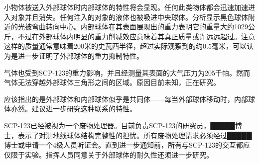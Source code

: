 小物体被送入外部球体时内部球体的特性将会显现。任何此类物体都会迅速加速进入对象并且消失。任何注入的对象的液体也被吸进中央球体。分析显示黑色球体附近的光被弯曲转向中心。内部球体在其表面展现出的重力表明它的重量大约1029公斤，不过在外部球体内明显的重力削减效应意味着其真正质量或许远远超过。注意这样的质量通常意味着200米的史瓦西半径，超过实际观察到的约0.5毫米，可以认为是进一步证明了外部球体的重力抑制特性。

气体也受到SCP-123的重力影响，并且经测量其表面的大气压力为205千帕。然而气体无法穿越外部球体三角形之间的区域。原因目前未知，正在研究。

应该指出的是外部球体和内部球体似乎是共同体——每当外部球体移动时，内部球体亦然。建议进一步研究这种联系的特性。

SCP-123已经被视为一个废物处理器。目前负责SCP-123的研究员，█████博士，表示了对测地线球体结构完整性的担忧。所有废物处理请求必须经过█████博士或申请一个4级人员听证会。直到进一步通知前，所有与SCP-123的交互都应仅限于实验。指挥人员同意关于外部球体的耐久性还须进一步研究。

